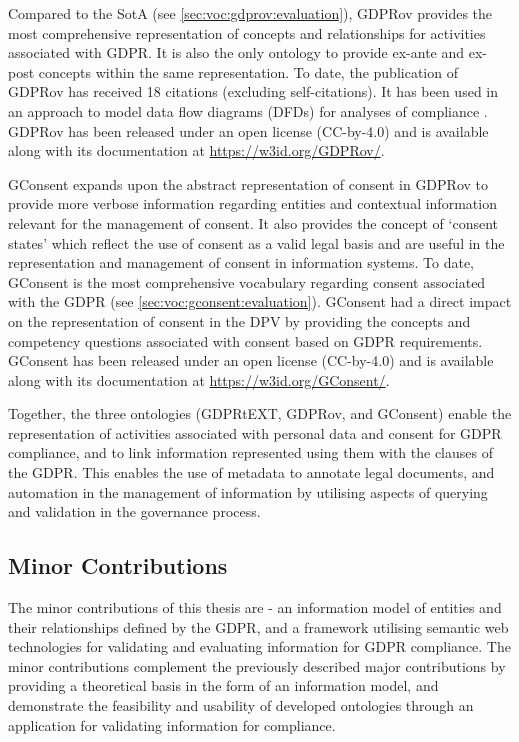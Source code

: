 Compared to the SotA (see \autoref{sec:voc:gdprov:evaluation}), GDPRov provides the most comprehensive representation of concepts and relationships for activities associated with GDPR.
It is also the only ontology to provide ex-ante and ex-post concepts within the same representation.
To date, the publication of GDPRov has received 18 citations (excluding self-citations). It has been used in an approach to model data flow diagrams (DFDs) for analyses of compliance \cite{debruyneOntologyRepresentingAnnotating2019}.
GDPRov has been released under an open license (CC-by-4.0) and is available along with its documentation at \url{https://w3id.org/GDPRov/}.

GConsent expands upon the abstract representation of consent in GDPRov to provide more verbose information regarding entities and contextual information relevant for the management of consent. It also provides the concept of `consent states' which reflect the use of consent as a valid legal basis and are useful in the  representation and management of consent in information systems. To date, GConsent is the most comprehensive vocabulary regarding consent associated with the GDPR (see \autoref{sec:voc:gconsent:evaluation}).
GConsent had a direct impact on the representation of consent in the DPV by providing the concepts and competency questions associated with consent based on GDPR requirements.
GConsent has been released under an open license (CC-by-4.0) and is available along with its documentation at \url{https://w3id.org/GConsent/}.

Together, the three ontologies (GDPRtEXT, GDPRov, and GConsent) enable the representation of activities associated with personal data and consent for GDPR compliance, and to link information represented using them with the clauses of the GDPR.
This enables the use of metadata to annotate legal documents, and automation in the management of information by utilising aspects of querying and validation in the governance process.

\subsection*{Minor Contributions}
The minor contributions of this thesis are - an information model of entities and their relationships defined by the GDPR, and a framework utilising semantic web technologies for validating and evaluating information for GDPR compliance. The minor contributions complement the previously described major contributions by providing a theoretical basis in the form of an information model, and demonstrate the feasibility and usability of developed ontologies through an application for validating information for compliance.

